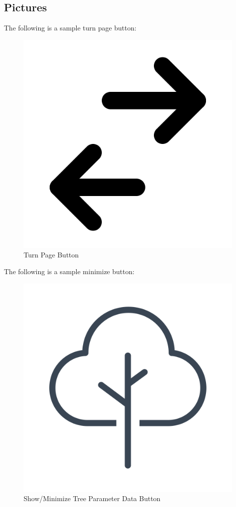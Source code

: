 \documentclass[12pt, titlepage]{article}
\begin{document}
\newpage

\subsection{Pictures}
The following is a sample turn page button:
\begin{figure}[H]
    \centering
    \includegraphics[scale = 0.5]{VnV_Pictures/turnpage_icon.png}
    \caption{Turn Page Button}
\end{figure}

\noindent The following is a sample minimize button:
\begin{figure}[H]
    \centering
    \includegraphics[scale = 0.5]{VnV_Pictures/tree_parameter.png}
    \caption{Show/Minimize Tree Parameter Data Button}
\end{figure}
\end{document}
